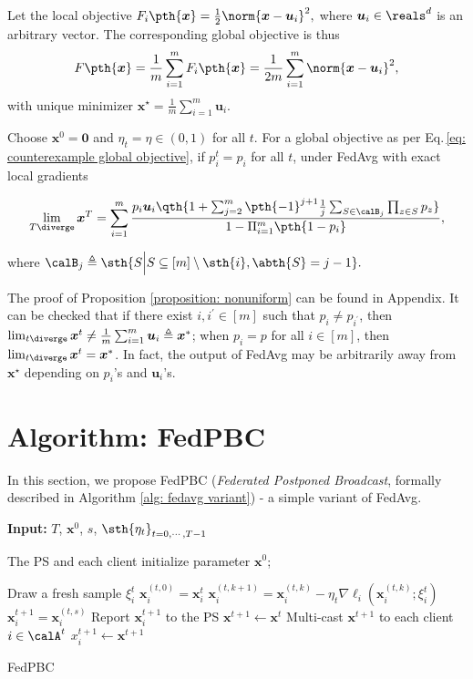 \documentclass[letterpaper, 10 pt, conference]{ieeeconf}  %
\newcommand{\x}{{\bm x}}
\newcommand{\bu}{{\bm u}}
\begin{document}
Let the local objective $F_i\pth{\x} = \frac{1}{2} \norm{\x - \bu_i}^2,$ where $\bu_i\in \reals^d$ is an arbitrary vector. The corresponding global objective is thus 
\begin{align}
F\pth{\x} = \frac{1}{m} \sum_{i=1}^m F_i\pth{\x} = \frac{1}{2m} \sum_{i=1}^m \norm{\x - \bu_i}^2,\label{eq: counterexample global objective}
\end{align}
with unique 
minimizer %
$\x^\star = \frac{1}{m} \sum_{i=1}^m \bu_i.$ 
\begin{proposition}
\label{proposition: nonuniform}
Choose $\x^0 = \bm{0}$ and $\eta_t = \eta \in (0,1)$ for all $t$. 
For a global objective as per Eq.\,\eqref{eq: counterexample global objective}, if $p_i^t=p_i$ for all $t$, 
under {FedAvg} with exact local gradients %
\begin{small}
\[
\lim_{T\diverge}\x^T = \sum_{i=1}^m\frac{p_i\bu_i \qth{1
+\sum_{j=2}^{m} \pth{-1}^{j+1} \frac{1}{j}\sum_{ 
S \in \calB_j} \prod_{z\in S} p_z}}{1-\Pi_{i=1}^m \pth{1-p_i}},
\]
\end{small}
where $\calB_j \triangleq \sth{S\Big|S\subseteq [m]\setminus\sth{i}, \abth{S} = j-1}.$
\end{proposition}
The proof of Proposition \ref{proposition: nonuniform} can be found in Appendix. 
It can be checked that if there exist $i, i^{\prime}\in [m]$ such that $p_i\not=p_{i^{\prime}}$,  then $\lim_{t\diverge}\x^t\not= \frac{1}{m}\sum_{i=1}^m \bm{u}_i \triangleq \x^*$; when $p_i=p$ for all $i\in [m]$, then $\lim_{t\diverge}\x^t =\x^*$. 
In fact, the output of FedAvg may be arbitrarily away from $\x^{\star}$ depending on $p_i$'s and $\bu_i$'s. 



\section{Algorithm: {FedPBC}} 
In this section, we propose {FedPBC} ({\em Federated Postponed Broadcast}, formally described in Algorithm \ref{alg: fedavg variant}) - a simple variant of {FedAvg}. 
\begin{algorithm}[h]
\textbf{Input:} $T$, $\x^0$, $s$, $\sth{\eta_t}_{t=0, \cdots, T-1}$ 

The PS and each client initialize parameter $\x^0$; 

{

{
Draw a fresh sample $\xi_{i}^t$\;
$\x_i^{(t,0)} = \x_i^{t}$\; 
{
$\x_i^{(t, k+1)} = \x_i^{(t, k)} - \eta_t \nabla \ell_i(\x_i^{(t, k)}; \xi_{i}^t)$\;  
}
$\x_i^{t+1} = \x_i^{(t, s)}$\; 
Report $\x_i^{t+1}$ to the PS\; 
} 
\eIf{$\calA^t\not=\emptyset$}{$\x^{t+1} \gets \frac{1}{\abth{\calA^t}} \sum_{i\in \calA^t}\x_i^{t+1}$\; }
{
$\x^{t+1} \gets \x^{t}$\; 
}
Multi-cast $\x^{t+1}$ to each client $i\in \calA^t$\; 
{
$x_i^{t+1} \gets \x^{t+1}$\; 
}
}
\caption{{FedPBC}}
\label{alg: fedavg variant}
\end{algorithm}
\end{document}
